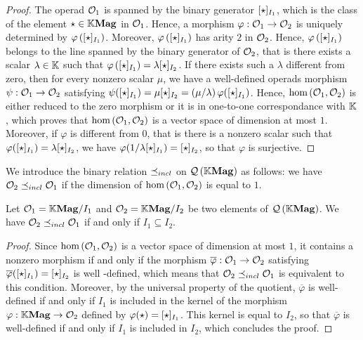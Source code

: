 \begin{proof}
  The operad $\mathcal{O}_1$ is spanned by the binary generator
  $[\operatorname{\star}]_{I_1}$, which is the class of the element
  $\operatorname{\star}\in\mathbb{K}\mathbf{Mag}$ in $\mathcal{O}_1$. Hence, a morphism
  $\varphi:\mathcal{O}_1\to\mathcal{O}_2$ is uniquely determined by
  $\varphi\left([\operatorname{\star}]_{I_1}\right)$. Moreover,
  $\varphi\left([\operatorname{\star}]_{I_1}\right)$ has arity $2$ in $\mathcal{O}_2$.
  Hence, $\varphi\left([\operatorname{\star}]_{I_1}\right)$ belongs to the line
  spanned by the binary generator of $\mathcal{O}_2$, that is there exists a
  scalar $\lambda\in\mathbb{K}$ such that $\varphi\left([\operatorname{\star}]_{I_1}\right)
  =\lambda[\operatorname{\star}]_{I_2}$. If there exists such a $\lambda$ different
  from zero, then for every nonzero scalar $\mu$, we have a well-defined
  operads morphism $\psi:\mathcal{O}_1\to\mathcal{O}_2$ satisfying
  $\psi([\operatorname{\star}]_{I_1}) =\mu[\operatorname{\star}]_{I_2}=
  \left(\mu/\lambda\right)\varphi([\operatorname{\star}]_{I_1})$. Hence,
  $\text{hom}\left(\mathcal{O}_1,\mathcal{O}_2\right)$ is either reduced to the zero
  morphism or it is in one-to-one correspondance with $\mathbb{K}$, which proves
  that $\text{hom}\left(\mathcal{O}_1,\mathcal{O}_2\right)$ is a vector space of
  dimension at most $1$. Moreover, if $\varphi$ is different from $0$,
  that is there is a nonzero scalar such that $\varphi([\operatorname{\star}]_{I_1})
  =\lambda[\operatorname{\star}]_{I_2}$, we have $\varphi(1/\lambda[\operatorname{\star}]_{I_1})
  =[\operatorname{\star}]_{I_2}$, so that $\varphi$ is surjective.
\end{proof}

We introduce the binary relation $\preceq_{incl}$ on $\mathcal{Q}\left(\mathbb{K}\mathbf{Mag}\right)$ as follows: we
have $\mathcal{O}_2\preceq_{incl}\mathcal{O}_1$ if the dimension of
$\text{hom}\left(\mathcal{O}_1,\mathcal{O}_2\right)$ is equal to $1$.

\begin{Proposition} \label{prop:order_relations_on_QMag_and_ideals}
  Let $\mathcal{O}_1=\mathbb{K}\mathbf{Mag}/I_1$ and $\mathcal{O}_2=\mathbb{K}\mathbf{Mag}/I_2$ be two elements of
  $\mathcal{Q}\left(\mathbb{K}\mathbf{Mag}\right)$.   We have $\mathcal{O}_2\preceq_{incl}\mathcal{O}_1$ if and only if
  $I_1\subseteq I_2$.
\end{Proposition}

\begin{proof}
  Since $\text{hom}\left(\mathcal{O}_1,\mathcal{O}_2\right)$ is a vector space of
  dimension at most $1$, it contains a nonzero morphism if and only if
  the morphism $\overline{\varphi}:\mathcal{O}_1\to\mathcal{O}_2$ satisfying
  $\overline{\varphi}([\operatorname{\star}]_{I_1})=[\operatorname{\star}]_{I_2}$ is well
  -defined, which means that $\mathcal{O}_2\preceq_{incl}\mathcal{O}_1$ is equivalent to this
  condition. Moreover, by the universal property of the quotient,
  $\overline{\varphi}$ is well-defined if and only if $I_1$ is included
  in the kernel of the morphism $\varphi:\mathbb{K}\mathbf{Mag}\to\mathcal{O}_2$ defined by
  $\varphi(\operatorname{\star})=[\operatorname{\star}]_{I_1}$. This kernel is equal to
  $I_2$, so that $\overline{\varphi}$ is well-defined if and only if
  $I_1$ is included in $I_2$, which concludes the proof.
\end{proof}

